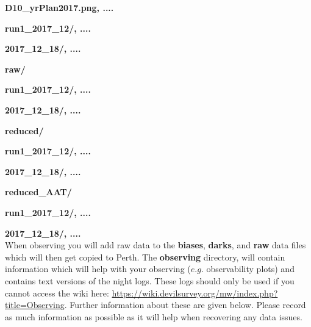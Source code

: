 \documentclass[12pt]{article}
\begin{document}
\hspace{15mm} \textbf{D10\_yrPlan2017.png, ....} 
\vspace{1mm}

\hspace{15mm} \textbf{run1\_2017\_12/, ....} 
\vspace{1mm}

\hspace{20mm} \textbf{2017\_12\_18/, ....}
\vspace{1mm}

\hspace{10mm} \textbf{raw/} 
\vspace{1mm}

\hspace{15mm} \textbf{run1\_2017\_12/, ....} 
\vspace{1mm}

\hspace{20mm} \textbf{2017\_12\_18/, ....} 
\vspace{1mm}

\hspace{10mm} \textbf{reduced/}
\vspace{1mm}

\hspace{15mm} \textbf{run1\_2017\_12/, ....} 
\vspace{1mm}

\hspace{20mm} \textbf{2017\_12\_18/, ....}
\vspace{1mm}

\hspace{10mm} \textbf{reduced\_AAT/}
\vspace{1mm}

\hspace{15mm} \textbf{run1\_2017\_12/, ....} 
\vspace{1mm}

\hspace{20mm} \textbf{2017\_12\_18/, ....} \\


When observing you will add raw data to the \textbf{biases},  \textbf{darks}, and \textbf{raw} data files which will then get copied to Perth. The \textbf{observing} directory, will contain information which will help with your observing ($e.g.$ observability plots) and contains text versions of the night logs. These logs should only be used if you cannot access the wiki here:  \url{https://wiki.devilsurvey.org/mw/index.php?title=Observing}. Further information about these are given below. Please record as much information as possible as it will help when recovering any data issues. 
\end{document}
